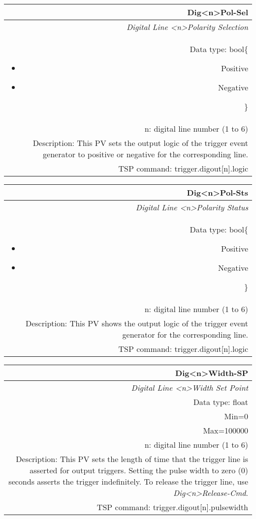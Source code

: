 \documentclass[openany]{article}
\begin{document}
		\begin{tabular}{N}
			\hline
			\bfseries Dig{\textless n\textgreater}Pol-Sel\label{pv:digpol-sel} \\ \hline
			\emph{Digital Line \textless n\textgreater Polarity Selection} \\
			Data type: bool\{\begin{itemize}[noitemsep]
				\small
				\item[] Positive
				\item[] Negative
			\end{itemize}\} \\
			n: digital line number (1 to 6) \\
			Description: This PV sets the output logic of the trigger event generator to positive or negative for the corresponding line. \\
			TSP command: trigger.digout[n].logic
		\end{tabular}

		\begin{tabular}{N}
			\hline
			\bfseries Dig{\textless n\textgreater}Pol-Sts\label{pv:digpol-sts} \\ \hline
			\emph{Digital Line \textless n\textgreater Polarity Status} \\
			Data type: bool\{\begin{itemize}[noitemsep]
				\small
				\item[] Positive
				\item[] Negative
			\end{itemize}\} \\
			n: digital line number (1 to 6) \\
			Description: This PV shows the output logic of the trigger event generator for the corresponding line. \\
			TSP command: trigger.digout[n].logic
		\end{tabular}

		\begin{tabular}{N}
			\hline
			\bfseries Dig{\textless n\textgreater}Width-SP\label{pv:digwidth-sp} \\ \hline
			\emph{Digital Line \textless n\textgreater Width Set Point} \\
			Data type: float \\
			Min=0 \\
			Max=100000 \\
			n: digital line number (1 to 6) \\
			Description: This PV sets the length of time that the trigger line is asserted for output triggers. Setting the pulse width to zero (0) seconds asserts the trigger indefinitely. To release the trigger line, use \emph{Dig{\textless n\textgreater}Release-Cmd}. \\
			TSP command: trigger.digout[n].pulsewidth
		\end{tabular}
\end{document}
